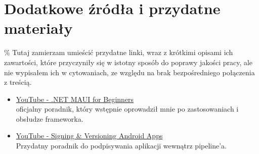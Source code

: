 \section{Dodatkowe źródła i przydatne materiały}
\% Tutaj zamierzam umieścić przydatne linki, wraz z krótkimi opisami ich zawartości,
które przyczyniły się w istotny sposób do poprawy jakości pracy, ale nie wypisałem ich w cytowaniach,
ze względu na brak bezpośredniego połączenia z treścią.

\begin{itemize}
    \item \href{https://www.youtube.com/playlist?list=PLdo4fOcmZ0oUBAdL2NwBpDs32zwGqb9DY}{YouTube - .NET MAUI for Beginners} \\
        oficjalny poradnik, który wstępnie oprowadził mnie po zastosowaniach i obsłudze frameworka.
    \item \href{https://www.youtube.com/watch?v=s1grtSSIRVA}{YouTube - Signing \& Versioning Android Apps} \\
        Przydatny poradnik do podpisywania aplikacji wewnątrz pipeline'a.
\end{itemize}
